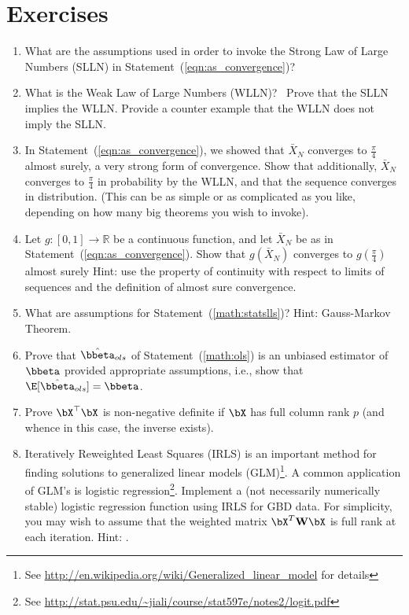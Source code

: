 \section{Exercises}
\label{sec:statistics_exercise}

\begin{enumerate}[label=\thechapter-\arabic*]
\item
What are the assumptions used in order to invoke the Strong Law of Large 
Numbers (SLLN) in Statement~(\ref{eqn:as_convergence})?

\item
What is the Weak Law of Large Numbers
(WLLN)?~
Prove that the SLLN implies the WLLN. Provide a counter example that the WLLN 
does not imply the SLLN.

\item
In Statement~(\ref{eqn:as_convergence}), we showed that $\bar{X}_N$ converges 
to $\frac{\pi}{4}$ almost surely,
a very strong form of convergence.  Show that 
additionally, $\bar{X}_N$ converges to $\frac{\pi}{4}$
in probability by the 
WLLN, and that the sequence converges
in distribution. (This can be as simple 
or as complicated as you like, depending on how many big theorems you wish to 
invoke).

\item
Let $g : [0, 1] \rightarrow  \mathbb{R}$ be a continuous function, and let 
$\bar{X}_N$ be as in Statement~(\ref{eqn:as_convergence}).  Show that 
$g(\bar{X}_N)$ converges to $g\left(\frac{\pi}{4}\right)$ almost surely
{\color{blue} Hint: 
use the property of continuity with respect to limits of sequences and the 
definition of almost sure convergence.}

\item
What are assumptions for Statement~(\ref{math:statslls})?
{\color{blue} Hint: Gauss-Markov Theorem.}

\item
Prove that $\hat{\bbeta}_{ols}$ of Statement~(\ref{math:ols}) is an unbiased
estimator of $\bbeta$ provided appropriate assumptions, i.e., show that
$\E[ \hat{\bbeta}_{ols} ] = \bbeta$.\label{ex:stat1}

\item
Prove $\bX^\top\bX$ is non-negative definite if $\bX$ has full column rank 
$p$ (and whence in this case, the inverse exists).

\item
Iteratively Reweighted Least Squares (IRLS) is an important method for finding 
solutions to generalized linear models (GLM)\footnote{See 
\url{http://en.wikipedia.org/wiki/Generalized_linear_model} for details}.  A 
common application of GLM's is logistic regression\footnote{See 
\url{http://stat.psu.edu/~jiali/course/stat597e/notes2/logit.pdf}}.
Implement a (not necessarily numerically stable) logistic regression function 
using IRLS for GBD data.  For simplicity, you may wish to assume that the 
weighted matrix $\bX^T\textbf{W}\bX$ is full rank at each iteration.
{\color{blue} Hint: \citet{McCullagh1989}.}
  
\end{enumerate}


